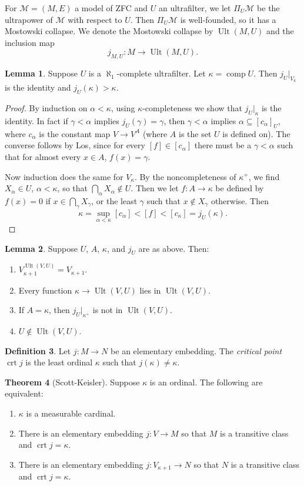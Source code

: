 \documentclass[12pt]{report}
\DeclareMathOperator{\comp}{comp}
\DeclareMathOperator{\crt}{crt}
\DeclareMathOperator{\Ult}{Ult}
\newcommand{\dfn}[1]{\emph{#1}\index{#1}}
\theoremstyle{definition}
\newtheorem{theorem}{Theorem}[chapter]
\newtheorem{lemma}[theorem]{Lemma}
\newtheorem{definition}[theorem]{Definition}
\begin{document}
For $\mathcal M = (M, E)$ a model of ZFC and $U$ an ultrafilter, we let $\Pi_U \mathcal M$ be the ultrapower of $\mathcal M$ with respect to $U$. Then $\Pi_U \mathcal M$ is well-founded, so it has a Mostowski collapse. We denote the Mostowski collapse by $\Ult(M, U)$ and the inclusion map
$$j_{M,U}: M \to \Ult(M, U).$$
\begin{lemma}
    Suppose $U$ is a $\aleph_1$-complete ultrafilter. Let $\kappa = \comp U$. Then $j_U|_{V_\kappa}$ is the identity and $j_U(\kappa) > \kappa$.
\end{lemma}
\begin{proof}
    By induction on $\alpha < \kappa$, using $\kappa$-completeness we show that $j_U|_\kappa$ is the identity. In fact if $\gamma < \alpha$ implies $j_U(\gamma) = \gamma$, then $\gamma < \alpha$ implies $\alpha \subseteq [c_\alpha]_U$, where $c_\alpha$ is the constant map $V \to V^A$ (where $A$ is the set $U$ is defined on). The converse follows by Los, since for every $[f] \in [c_\alpha]$ there must be a $\gamma < \alpha$ such that for almost every $x \in A$, $f(x) = \gamma$.

    Now induction does the same for $V_\kappa$. By the noncompleteness of $\kappa^+$, we find $X_\alpha \in U$, $\alpha < \kappa$, so that $\bigcap_\alpha X_\alpha \notin U$. Then we let $f: A \to \kappa$ be defined by $f(x) = 0$ if $x \in \bigcap_\gamma X_\gamma$, or the least $\gamma$ such that $x \notin X_\gamma$ otherwise. Then
    $$\kappa = \sup_{\alpha < \kappa} [c_\alpha] < [f] < [c_\kappa] = j_U(\kappa).$$
\end{proof}
\begin{lemma}
    Suppose $U$, $A$, $\kappa$, and $j_U$ are as above. Then:
\begin{enumerate}
    \item $V_{\kappa+1}^{\Ult(V, U)} = V_{\kappa+1}$.
    \item Every function $\kappa \to \Ult(V, U)$ lies in $\Ult(V, U)$.
    \item If $A = \kappa$, then $j_U|_{\kappa^+}$ is not in $\Ult(V, U)$.
    \item $U \notin \Ult(V, U)$.
\end{enumerate}
\end{lemma}
\begin{definition}
    Let $j: M \to N$ be an elementary embedding. The \dfn{critical point} $\crt j$ is the least ordinal $\kappa$ such that $j(\kappa) \neq \kappa$.
\end{definition}
\begin{theorem}[Scott-Keisler]
    Suppose $\kappa$ is an ordinal. The following are equivalent:
\begin{enumerate}
    \item $\kappa$ is a measurable cardinal.
    \item There is an elementary embedding $j: V \to M$ so that $M$ is a transitive class and $\crt j = \kappa$.
    \item There is an elementary embedding $j: V_{\kappa+1} \to N$ so that $N$ is a transitive class and $\crt j = \kappa$.
\end{enumerate}
\end{theorem}
\end{document}
